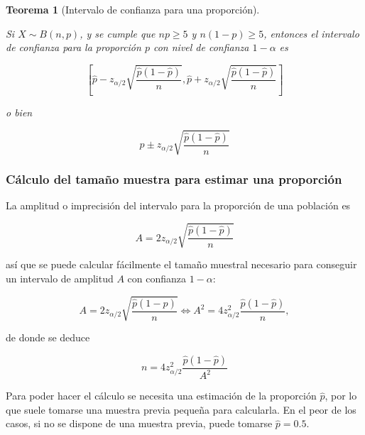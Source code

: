 \documentclass[
  spanish,
  a4paper,
]{scrreport}
\theoremstyle{plain}
\newtheorem{theorem}{Teorema}[chapter]
\theoremstyle{definition}
\theoremstyle{definition}
\theoremstyle{remark}
\begin{document}
\begin{theorem}[Intervalo de confianza para una
proporción]\protect\hypertarget{thm-intervalo-confianza-proporcion}{}\label{thm-intervalo-confianza-proporcion}

Si \(X\sim B(n,p)\), y se cumple que \(np\geq 5\) y \(n(1-p)\geq 5\),
entonces el \emph{intervalo de confianza para la proporción} \(p\) con
nivel de confianza \(1-\alpha\) es

\[
\left[\hat{p}-z_{\alpha/2}\sqrt{\frac{\hat{p}(1-\hat{p})}{n}},\hat{p}+z_{\alpha/2}\sqrt{\frac{\hat{p}(1-\hat{p})}{n}}\right]
\]

o bien

\[
\hat{p}\pm z_{\alpha/2}\sqrt{\frac{\hat{p}(1-\hat{p})}{n}}
\]

\end{theorem}

\subsubsection{Cálculo del tamaño muestra para estimar una
proporción}\label{cuxe1lculo-del-tamauxf1o-muestra-para-estimar-una-proporciuxf3n}

La amplitud o imprecisión del intervalo para la proporción de una
población es

\[
A= 2 z_{\alpha/2}\sqrt{\frac{\hat{p}(1-\hat{p})}{n}}
\]

así que se puede calcular fácilmente el tamaño muestral necesario para
conseguir un intervalo de amplitud \(A\) con confianza \(1-\alpha\):

\[
A= 2 z_{\alpha/2}\sqrt{\frac{\hat{p}(1-\hat{p})}{n}} \Leftrightarrow A^2= 4 z_{\alpha/2}^2\frac{\hat{p}(1-\hat{p})}{n},
\]

de donde se deduce

\[
{n= 4 z_{\alpha/2}^2\frac{\hat{p}(1-\hat{p})}{A^2}}
\]

Para poder hacer el cálculo se necesita una estimación de la proporción
\(\hat{p}\), por lo que suele tomarse una muestra previa pequeña para
calcularla. En el peor de los casos, si no se dispone de una muestra
previa, puede tomarse \(\hat{p}=0.5\).
\end{document}
